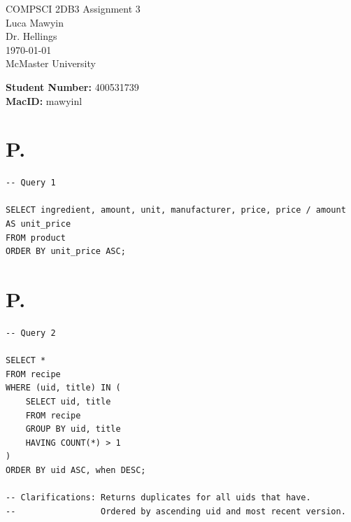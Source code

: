 \documentclass[letterpaper]{article}
\theoremstyle{plain}
\theoremstyle{definition}
\theoremstyle{remark}
\begin{document}

\begin{titlepage}
    \centering
    \vspace*{3cm}
    
    {\Huge COMPSCI 2DB3 Assignment 3}\\[2cm]
    
    {\large Luca Mawyin}\\[0.5cm]
    
    {\large Dr. Hellings}\\[0.5cm]

    {\large \today}\\[2cm]

    {\Large McMaster University}

    \vfill
    \begin{flushleft}

        {\large \textbf{Student Number: }400531739}\\[0.5cm]
        {\large \textbf{MacID: }mawyinl}
    \end{flushleft}

\end{titlepage}

\section*{P.\thesection}

\begin{verbatim}
-- Query 1

SELECT ingredient, amount, unit, manufacturer, price, price / amount AS unit_price
FROM product
ORDER BY unit_price ASC;
\end{verbatim}

\section*{P.\thesection}

\begin{verbatim}
-- Query 2

SELECT * 
FROM recipe
WHERE (uid, title) IN (
    SELECT uid, title
    FROM recipe
    GROUP BY uid, title
    HAVING COUNT(*) > 1
)
ORDER BY uid ASC, when DESC;

-- Clarifications: Returns duplicates for all uids that have. 
--                 Ordered by ascending uid and most recent version.

\end{verbatim}
\end{document}
